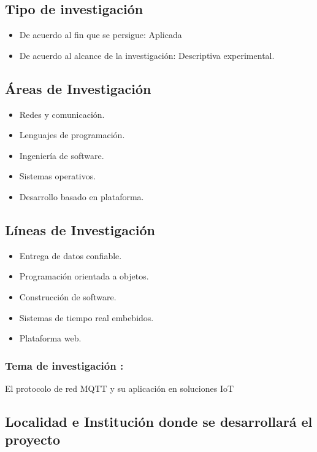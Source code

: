 \documentclass[a4paper, 12pt]{article}
\begin{document}
\subsection{Tipo de investigación}

\begin{itemize}
\item De acuerdo al fin que se persigue: Aplicada 
\item De acuerdo al alcance de  la investigación: Descriptiva experimental.
\end{itemize}



\subsection{Áreas de Investigación}
\begin{itemize}
\item Redes y comunicación.
\item Lenguajes de programación.
\item Ingeniería de software.
\item Sistemas operativos.
\item Desarrollo basado en plataforma.
\end{itemize}
\subsection{Líneas de Investigación}
\begin{itemize}
\item Entrega de datos confiable.
\item Programación orientada a objetos.
\item Construcción de software.
\item Sistemas de tiempo real embebidos.
\item Plataforma web.

\end{itemize}

               
\subsubsection{Tema de investigación :} 

El protocolo de red MQTT y su aplicación en soluciones IoT

\subsection{Localidad e Institución donde se desarrollará el proyecto }
\end{document}
